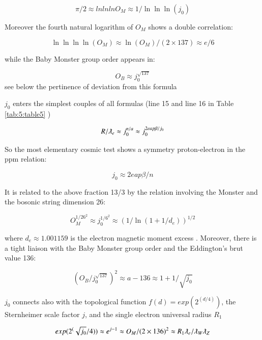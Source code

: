 \documentclass[a4paper,9pt]{article}
\begin{document}
 \begin{equation}
 \pi/2 \approx lnlnlnO_M \approx 1/\ln\ln\ln(j_0)
\end{equation}

Moreover the fourth natural logarithm of $O_M$ shows a double correlation:

 \begin{equation}
 \ln\ln\ln\ln(O_M) \approx \ln(O_M) /(2\times 137) \approx e/6
\end{equation}

while the Baby Monster group order appears in:

\begin{equation}
 O_B \approx j_0^{\sqrt{137}}
\end{equation}
see below the pertinence of deviation from this formula

$j_0$ enters the simplest couples of all formulas (line 15 and line 16 in 
 Table \ref{tab:5:table5} )
 
 \begin{equation}
 R/\lambdabar_e \approx j_0^{n/a} \approx j_0^{2eap\beta/j_0} 
\end{equation}

So the most elementary cosmic test shows a symmetry proton-electron in the ppm relation:

\begin{equation}
j_0 \approx 2eap\beta/n 
\end{equation}


It is related to the above fraction 13/3 by the relation involving the Monster and the bosonic string dimension 26:

\begin{equation}
  O_M^{1/26^2} \approx j_0^{1/6^2}\approx (1/\ln(1+1/d_e))^{1/2}   
\end{equation}

where $d_e \approx 1.001159$ is the electron magnetic moment excess \cite{Tanabashi}.
 Moreover, there is a tight liaison with the Baby Monster group order and the Eddington's brut value 136:
 
 \begin{equation}
 ( O_B/ j_0^{\sqrt{137}})^2 \approx a -136 \approx 1 + 1/\sqrt{j_0}
\end{equation}

$j_0$ connects also with the topological function $f(d ) = exp(2^(d/4))$, the Sternheimer scale factor $j$, and the single electron universal radius $R_1$ \cite{Sanchez}
 
 \begin{equation}
 exp(2^(\sqrt{j_0}/4)) \approx e^{j -1} \approx O_M/(2\times 136)^2 \approx R_1 \lambdabar_e / \lambdabar_W \lambdabar_Z
\end{equation}
\end{document}
